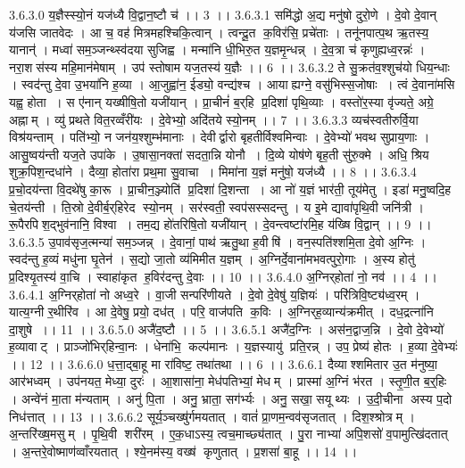 3.6.3.0
य॒ज्ञैस्स्यो॒नं यज॑ध्यै वि॒द्वान॒ष्टौ च॑ ।। 3 ।।
3.6.3.1
समि॑द्धो अ॒द्य मनु॑षो दुरो॒णे । दे॒वो दे॒वान् य॑जसि जातवेदः । आ च॒ वह॑ मित्रमहश्चिकि॒त्वान् । त्वन्दू॒त क॒विर॑सि॒ प्रचे॑ताः । तनू॑नपात्प॒थ ऋ॒तस्य॒ यानान्॑ । मध्वा॑ सम॒ञ्जन्थ्स्व॑दया सुजिह्व । मन्मा॑नि धी॒भिरु॒त य॒ज्ञमृ॒न्धन्न् । दे॒व॒त्रा च॑ कृणुह्यध्व॒रन्नः॑ । नरा॒शस॑स्य महि॒मान॑मेषाम् । उप॑ स्तोषाम यज॒तस्य॑ य॒ज्ञैः ।। 6 ।।
3.6.3.2
ते सु॒क्रत॑व॒श्शुच॑यो धिय॒न्धाः । स्वद॑न्तु दे॒वा उ॒भया॑नि ह॒व्या । आ॒जुह्वा॑न॒ ईड्यो॒ वन्द्य॑श्च । आयाह्यग्ने॒ वसु॑भिस्स॒जोषाः । त्वं दे॒वाना॑मसि यह्व॒ होता । स ए॑नान् यख्षीषि॒तो यजी॑यान् । प्रा॒चीनं॑ ब॒र्‌हि प्र॒दिशा॑ पृथि॒व्याः । वस्तो॑र॒स्या वृ॑ज्यते॒ अग्रे॒ अह्नाम् । व्यु॑ प्रथते वित॒रव्वँरी॑यः । दे॒वेभ्यो॒ अदि॑तये स्यो॒नम् ।। 7 ।।
3.6.3.3
व्यच॑स्वतीरुर्वि॒या विश्र॑यन्ताम् । पति॑भ्यो॒ न जन॑य॒श्शुम्भ॑मानाः । देवीर्द्वारो बृहतीर्विश्वमिन्वाः । दे॒वेभ्यो॑ भवथ सुप्राय॒णाः । आसु॒ष्वय॑न्ती यज॒ते उपा॑के । उ॒षासा॒नक्ता॑ सदता॒न्नि योनौ । दि॒व्ये योष॑णे बृह॒ती सु॑रु॒क्मे । अधि॒ श्रिय॑ शुक्र॒पिश॒न्दधा॑ने । दैव्या॒ होता॑रा प्रथ॒मा सु॒वाचा । मिमा॑ना य॒ज्ञं मनु॑षो॒ यज॑ध्यै ।। 8 ।।
3.6.3.4
प्र॒चो॒दय॑न्ता वि॒दथे॑षु का॒रू । प्रा॒चीन॒ञ्ज्योति॑ प्र॒दिशा॑ दि॒शन्ता । आ नो॑ य॒ज्ञं भार॑ती॒ तूय॑मेतु । इडा॑ मनु॒ष्वदि॒ह चे॒तय॑न्ती । ति॒स्रो दे॒वीर्ब॒र्‌हिरेद स्यो॒नम् । सर॑स्वती॒ स्वप॑सस्सदन्तु । य इ॒मे द्यावा॑पृथि॒वी जनि॑त्री । रू॒पैरपि॑श॒द्भुव॑नानि॒ विश्वा । तम॒द्य हो॑तरिषि॒तो यजी॑यान् । दे॒वन्त्वष्टा॑रमि॒ह य॑ख्षि वि॒द्वान् ।। 9 ।।
3.6.3.5
उ॒पाव॑सृज॒त्मन्या॑ सम॒ञ्जन्न् । दे॒वानां॒ पाथ॑ ऋतु॒था ह॒वीषि॑ । वन॒स्पति॑श्शमि॒ता दे॒वो अ॒ग्निः । स्वद॑न्तु ह॒व्यं मधु॑ना घृ॒तेन॑ । स॒द्यो जा॒तो व्य॑मिमीत य॒ज्ञम् । अ॒ग्निर्दे॒वाना॑मभवत्पुरो॒गाः । अ॒स्य होतु॑ प्र॒दिश्यृ॒तस्य॑ वा॒चि । स्वाहा॑कृत ह॒विर॑दन्तु दे॒वाः ।। 10 ।।
3.6.4.0
अ॒ग्निर्‌होता॑ नो॒ नव॑ ।। 4 ।।
3.6.4.1
अ॒ग्निर्‌होता॑ नो अध्व॒रे । वा॒जी सन्परि॑णीयते । दे॒वो दे॒वेषु॑ य॒ज्ञियः॑ । परि॑त्रिवि॒ष्ट्य॑ध्व॒रम् । यात्य॒ग्नी र॒थीरि॑व । आ दे॒वेषु॒ प्रयो॒ दध॑त् । परि॒ वाज॑पति क॒विः । अ॒ग्निर्‌ह॒व्यान्य॑क्रमीत् । दध॒द्रत्ना॑नि दा॒शुषे ।। 11 ।।
3.6.5.0
अजै॑द॒ष्टौ ।। 5 ।।
3.6.5.1
अजै॑द॒ग्निः । अस॑न॒द्वाज॒न्नि । दे॒वो दे॒वेभ्यो॑ ह॒व्यावाट् । प्राञ्जो॑भिर्‌हिन्वा॒नः । धेना॑भि॒ कल्प॑मानः । य॒ज्ञस्यायु॑ प्रति॒रन्न् । उप॒ प्रेष्य॑ होतः । ह॒व्या दे॒वेभ्यः॑ ।। 12 ।।
3.6.6.0
ध॒त्ता॒द्बा॒हू मा रा॑विष्ट॒ तथा॑तथा ।। 6 ।।
3.6.6.1
दैव्याश्शमितार उ॒त म॑नुष्या॒ आर॑भध्वम् । उप॑नयत॒ मेध्या॒ दुरः॑ । आ॒शासा॑ना॒ मेध॑पतिभ्यां॒ मेधम् । प्रास्मा॑ अ॒ग्निं भ॑रत । स्तृ॒णी॒त ब॒र्॒हिः । अन्वे॑नं मा॒ता म॑न्यताम् । अनु॑ पि॒ता । अनु॒ भ्राता॒ सग॑र्भ्यः । अनु॒ सखा॒ सयूथ्यः । उ॒दी॒चीना॑ अस्य प॒दो निध॑त्तात् ।। 13 ।।
3.6.6.2
सूर्य॒ञ्चख्षु॑र्गमयतात् । वातं॑ प्रा॒णम॒न्वव॑सृजतात् । दिश॒श्श्रोत्रम् । अ॒न्तरि॑ख्ष॒मसुम् । पृ॒थि॒वी शरी॑रम् । ए॒क॒धाऽस्य॒ त्वच॒माच्छ्य॑तात् । पु॒रा नाभ्या॑ अपि॒शसो॑ व॒पामुत्खि॑दतात् । अ॒न्तरे॒वोष्माण॑व्वाँरयतात् । श्ये॒नम॑स्य॒ वख्ष॑ कृणुतात् । प्र॒शसा॑ बा॒हू ।। 14 ।।
